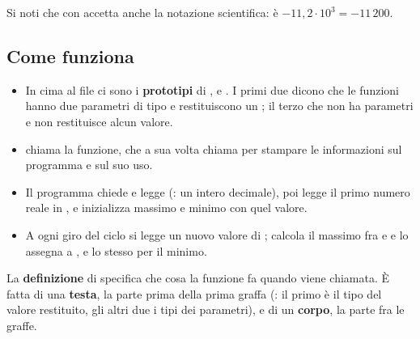 
Si noti che  con  accetta anche la notazione
scientifica:  è $-11{,}2 ^3 = -11\,200$.

\subsection{Come funziona}

\begin{itemize}
  \item In cima al file ci sono i \textbf{prototipi} di ,
         e . I primi due dicono che le funzioni
        hanno due parametri di tipo  e restituiscono un
        ; il terzo che  non ha parametri e non
        restituisce alcun valore.
  \item {} chiama la funzione, che a sua volta chiama
         per stampare le informazioni sul programma e sul suo
        uso.
  \item Il programma chiede e legge  (: un intero
        decimale), poi legge il primo numero reale in , e
         inizializza massimo e minimo con quel valore.
  \item A ogni giro del ciclo si legge un nuovo valore di ;
         calcola il massimo fra  e
         e lo assegna a , e lo stesso per il minimo.
\end{itemize}

La \textbf{definizione} di  specifica che cosa la funzione fa
quando viene chiamata. È fatta di una \textbf{testa}, la parte prima della
prima graffa (: il primo 
è il tipo del valore restituito, gli altri due i tipi dei parametri), e di un
\textbf{corpo}, la parte fra le graffe.

